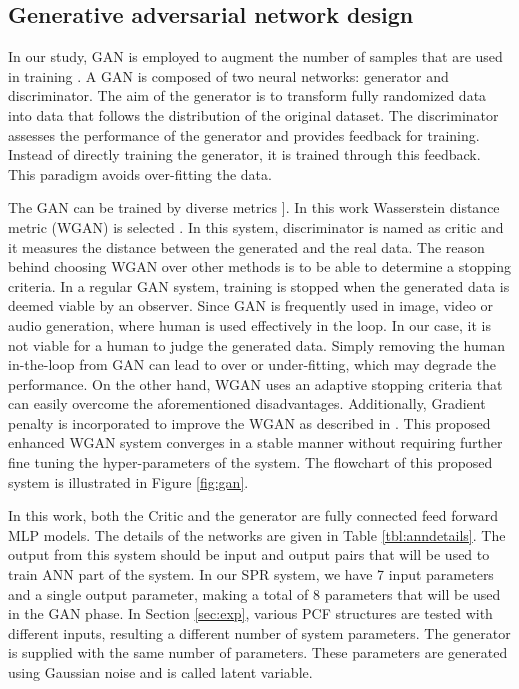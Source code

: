 \documentclass[10pt]{IEEEtran}
\begin{document}
\subsection{Generative adversarial network design}
\label{ssec:gan}

In our study, GAN is employed to augment the number of samples that are used in training  \cite{goodfellow2014generative}.  A GAN is composed of two neural networks: generator and discriminator. The aim of the generator is to transform fully randomized data into data that follows the distribution of the original dataset. The discriminator assesses the performance of the generator and provides feedback for training. Instead of directly training the generator, it is trained through this feedback. This paradigm avoids over-fitting the data.

The GAN can be trained by diverse metrics \cite{goodfellow2014generative, mao2017least, lucic2018gans}]. In this work Wasserstein distance metric (WGAN) is selected \cite{arjovsky2017wasserstein}. In this system, discriminator is named as critic and it measures the distance between the generated  and the real data. The reason behind choosing WGAN over other methods is to be able to determine a stopping criteria. In a regular GAN system, training is stopped when the generated data is deemed viable by an observer. Since GAN is frequently used in image, video or audio generation, where human is used effectively in the loop. In our case, it is not viable for a human to judge the generated data. Simply removing the human in-the-loop from GAN can lead to over or under-fitting, which may degrade the performance. On the other hand, WGAN uses an adaptive stopping criteria that can easily overcome the aforementioned disadvantages. Additionally, Gradient penalty is incorporated to improve the WGAN as described in \cite{gulrajani2017improved}. This proposed enhanced WGAN system converges in a stable manner without requiring further fine tuning the hyper-parameters of the system. The flowchart of this proposed system is illustrated in Figure \ref{fig:gan}.

In this work, both the Critic and the generator are fully connected feed forward MLP models. The details of the networks are given in Table \ref{tbl:anndetails}. The output from this system should be input and output pairs that will be used to train ANN part of the system. In our SPR system, we have 7 input parameters and a single output parameter, making a total of 8 parameters that will be used in the GAN phase. In Section \ref{sec:exp}, various PCF structures are tested with different inputs, resulting a different number of system parameters. The generator is supplied with the same number of parameters. These parameters are generated using Gaussian noise and is called latent variable.
\end{document}
